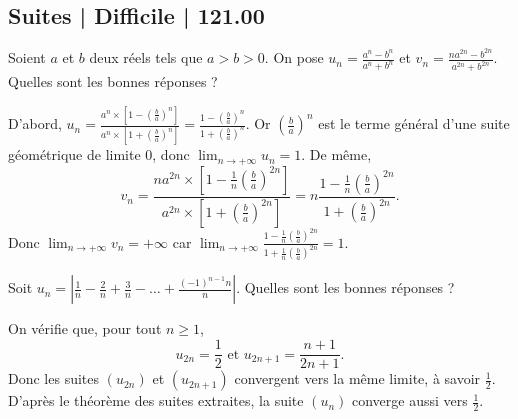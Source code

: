 \subsection{Suites | Difficile | 121.00}



\begin{question}
Soient $a$ et $b$ deux réels tels que $a>b>0$. On pose $\displaystyle u_n=\frac{a^n-b^n}{a^n+b^n}$ et $\displaystyle v_n=\frac{na^{2n}-b^{2n}}{a^{2n}+b^{2n}}$. Quelles sont les bonnes réponses ?
\begin{answers}  
\end{answers}
\begin{explanations}
D'abord, $\displaystyle u_n=\frac{a^n\times \left[1-\left(\frac{b}{a}\right)^n\right]}{a^n\times \left[1+\left(\frac{b}{a}\right)^n\right]}=\frac{1-\left(\frac{b}{a}\right)^n}{1+\left(\frac{b}{a}\right)^n}$. Or $\displaystyle \left(\frac{b}{a}\right)^n$ est le terme général d'une suite géométrique de limite $0$, donc $\displaystyle \lim _{n\to +\infty}u_n=1$. De même, 
$$\displaystyle v_n=\frac{na^{2n}\times \left[1-\frac{1}{n}\left(\frac{b}{a}\right)^{2n}\right]}{a^{2n}\times \left[1+\left(\frac{b}{a}\right)^{2n}\right]}=n\frac{1-\frac{1}{n}\left(\frac{b}{a}\right)^{2n}}{1+\left(\frac{b}{a}\right)^{2n}}.$$
Donc $\displaystyle \lim _{n\to +\infty}v_n=+\infty$ car $\displaystyle \lim _{n\to +\infty}\frac{1-\frac{1}{n}\left(\frac{b}{a}\right)^{2n}}{1+\frac{1}{n}\left(\frac{b}{a}\right)^{2n}}=1$.
\end{explanations}
\end{question}



\begin{question}
Soit $\displaystyle u_n=\left|\frac{1}{n}-\frac{2}{n}+\frac{3}{n}-\dots+\frac{(-1)^{n-1}n}{n}\right|$. Quelles sont les bonnes réponses ?
\begin{answers}  
\end{answers}
\begin{explanations}
On vérifie que, pour tout $n\geq 1$,
$$u_{2n}=\frac{1}{2}\mbox{ et }u_{2n+1}=\frac{n+1}{2n+1}.$$
Donc les suites $(u_{2n})$ et $(u_{2n+1})$ convergent vers la même limite, à savoir $\displaystyle \frac{1}{2}$. D'après le théorème des suites extraites, la suite $(u_n)$ converge aussi vers $\displaystyle \frac{1}{2}$.
\end{explanations}
\end{question}



